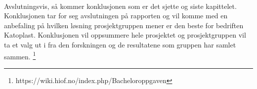 \paragraph{} Avslutningsvis, så kommer konklusjonen som er det sjette og siste kapittelet. Konklusjonen tar for seg avslutningen på rapporten og vil komme med en anbefaling på hvilken løsning prosjektgruppen mener er den beste for bedriften Katoplast. Konklusjonen vil oppsummere hele prosjektet og prosjektgruppen vil ta et valg ut i fra den forskningen og de resultatene som gruppen har samlet sammen. 
\footnote{https://wiki.hiof.no/index.php/Bacheloroppgaven}
